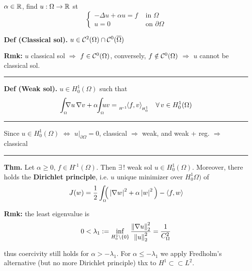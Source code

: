 
$\alpha\in\mathbb{R}$, find $u:\Omega\to\mathbb{R}$ st
\begin{equation*}
\begin{cases}
    -\Delta u +\alpha u = f &\text{ in }\Omega\\
    u=0 &\text{ on }\partial\Omega    
\end{cases}
\end{equation*}

\textbf{Def (Classical sol).} $u\in\mathcal{C}^2(\Omega)\cap\mathcal{C}^0(\overline{\Omega})$

\smallskip

\textbf{Rmk:} $u$ classical sol $\Rightarrow$ $f\in\mathcal{C}^0(\Omega)$, conversely, $f\notin\mathcal{C}^0(\Omega)$ $\Rightarrow$ $u$ cannot be classical sol.

\rule{0.31\textwidth}{0.2pt}
\smallskip

\textbf{Def (Weak sol).} $u\in H^1_0(\Omega)$ such that
\begin{equation*}
\int_{_\Omega}\!\!\!  \nabla u\,\nabla v +\alpha\!\!\int_{_\Omega}\!\!\!  uv ={}_{_{H^{\text{-}1}}}\!\!\sca{f,v}{}_{_{\!\!H^1_0}}\quad\forall\, v\in H^1_0(\Omega)
\end{equation*}

\rule{0.31\textwidth}{0.2pt}
\smallskip

Since $u\in H^1_0(\Omega)$ $\Leftrightarrow$ $u\big|_{\partial \Omega}=0$, classical $\Rightarrow$ weak, and weak + reg. $\Rightarrow$ classical

\rule{0.31\textwidth}{0.2pt}
\smallskip

\textbf{Thm.} Let $\alpha\geq 0$, $f\in H^{\text{-}1}(\Omega)$. Then $\exists\,!$ weak sol $u\in H^1_0(\Omega)$. Moreover, there holds the \textbf{Dirichlet principle}, i.e. $u$ unique minimizer over $H^1_0\Omega)$ of 
\begin{equation*}
J(w)=\frac{1}{2}\int_{_\Omega}\!\!\!  \Big( \left| \nabla w \right|^2+\alpha\left| w \right|^2 \Big)-\left\langle f,w \right\rangle
\end{equation*}

\textbf{Rmk:} the least eigenvalue is 
\begin{equation*}
0<\lambda_1:=\inf_{H^1_0\setminus\{0\}} \frac{\left\lVert \nabla u \right\rVert_2^2}{\left\lVert u \right\rVert_2^2}=\frac{1}{C_\Omega^2}  
\end{equation*}

thus coercivity still holds for $\alpha>-\lambda_1$. For $\alpha\leq -\lambda_1$ we apply Fredholm's alternative (but no more Dirichlet principle) thx to $H^1\subset\subset L^2$.

